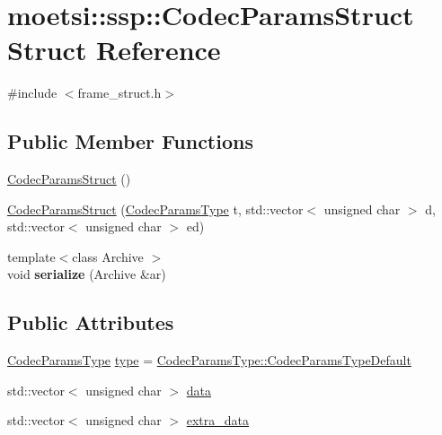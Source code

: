 \hypertarget{structmoetsi_1_1ssp_1_1CodecParamsStruct}{}\section{moetsi\+:\+:ssp\+:\+:Codec\+Params\+Struct Struct Reference}
\label{structmoetsi_1_1ssp_1_1CodecParamsStruct}


{\ttfamily \#include $<$frame\+\_\+struct.\+h$>$}

\subsection*{Public Member Functions}
\begin{DoxyCompactItemize}
\item 
\hyperlink{structmoetsi_1_1ssp_1_1CodecParamsStruct_ae2d0f15ae18885a73ac37cf51c78abf4}{Codec\+Params\+Struct} ()
\item 
\hyperlink{structmoetsi_1_1ssp_1_1CodecParamsStruct_a51ed920bba6aef88b4d70bcf9b2647de}{Codec\+Params\+Struct} (\hyperlink{namespacemoetsi_1_1ssp_a6d638ba0bd38e9daded08f633d893563}{Codec\+Params\+Type} t, std\+::vector$<$ unsigned char $>$ d, std\+::vector$<$ unsigned char $>$ ed)
\item 
\mbox{\label{structmoetsi_1_1ssp_1_1CodecParamsStruct_a5cc4146e3f530a895ca13f37165b140a}} 
{\footnotesize template$<$class Archive $>$ }\\void {\bfseries serialize} (Archive \&ar)
\end{DoxyCompactItemize}
\subsection*{Public Attributes}
\begin{DoxyCompactItemize}
\item 
\hyperlink{namespacemoetsi_1_1ssp_a6d638ba0bd38e9daded08f633d893563}{Codec\+Params\+Type} \hyperlink{structmoetsi_1_1ssp_1_1CodecParamsStruct_a94a427a8907bb5a23c4f6ee2117a4803}{type} = \hyperlink{namespacemoetsi_1_1ssp_a6d638ba0bd38e9daded08f633d893563a1ffd3a6c06641b95d3e5142403ed0730}{Codec\+Params\+Type\+::\+Codec\+Params\+Type\+Default}
\item 
std\+::vector$<$ unsigned char $>$ \hyperlink{structmoetsi_1_1ssp_1_1CodecParamsStruct_a1b95f1879573fb5da8ece8d22057c1b3}{data}
\item 
std\+::vector$<$ unsigned char $>$ \hyperlink{structmoetsi_1_1ssp_1_1CodecParamsStruct_a987b3974df91d9d65960d379bb8e55cc}{extra\+\_\+data}
\end{DoxyCompactItemize}



